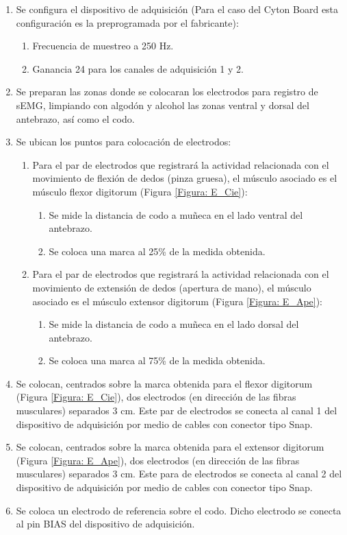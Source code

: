 \begin{enumerate}
	\item Se configura el dispositivo de adquisición (Para el caso del Cyton Board esta configuración es la preprogramada por el fabricante):
	\begin{enumerate}
		\item Frecuencia de muestreo a 250 Hz.
		\item Ganancia 24 para los canales de adquisición 1 y 2.
	\end{enumerate}
	\item Se preparan las zonas donde se colocaran los electrodos para registro de sEMG, limpiando con algodón y alcohol las zonas ventral y dorsal del antebrazo, así como el codo.
	\item Se ubican los puntos para colocación de electrodos:
	\begin{enumerate}
		\item Para el par de electrodos que registrará la actividad relacionada con el movimiento de flexión de dedos (pinza gruesa), el músculo asociado es el músculo flexor digitorum (Figura \ref{Figura: E_Cie}):
		\begin{enumerate}
			\item Se mide la distancia de codo a muñeca en el lado ventral del antebrazo.
			\item Se coloca una marca al 25\% de la medida obtenida.
		\end{enumerate}
		\item Para el par de electrodos que registrará la actividad relacionada con el movimiento de extensión de dedos (apertura de mano), el músculo asociado es el músculo extensor digitorum (Figura \ref{Figura: E_Ape}):
		\begin{enumerate}
			\item Se mide la distancia de codo a muñeca en el lado dorsal del antebrazo.
			\item Se coloca una marca al 75\% de la medida obtenida.
		\end{enumerate}
	\end{enumerate}
	\item Se colocan, centrados sobre la marca obtenida para el flexor digitorum (Figura \ref{Figura: E_Cie}), dos electrodos (en dirección de las fibras musculares) separados 3 cm. Este par de electrodos se conecta al canal 1 del dispositivo de adquisición por medio de cables con conector tipo Snap.
	\item Se colocan, centrados sobre la marca obtenida para el extensor digitorum (Figura \ref{Figura: E_Ape}), dos electrodos (en dirección de las fibras musculares) separados 3 cm. Este para de electrodos se conecta al canal 2 del dispositivo de adquisición por medio de cables con conector tipo Snap.
	\item Se coloca un electrodo de referencia sobre el codo. Dicho electrodo se conecta al pin BIAS del dispositivo de adquisición.
\end{enumerate}

